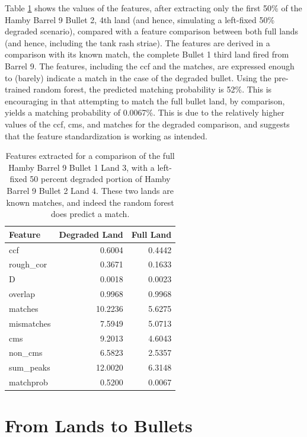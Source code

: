 \documentclass[12pt,]{article}
\theoremstyle{definition}
\theoremstyle{definition}
\theoremstyle{definition}
\theoremstyle{remark}
\begin{document}
Table \ref{tab:br924pred} shows the values of the features, after
extracting only the first 50\% of the Hamby Barrel 9 Bullet 2, 4th land
(and hence, simulating a left-fixed 50\% degraded scenario), compared
with a feature comparison between both full lands (and hence, including
the tank rash striae). The features are derived in a comparison with its
known match, the complete Bullet 1 third land fired from Barrel 9. The
features, including the ccf and the matches, are expressed enough to
(barely) indicate a match in the case of the degraded bullet. Using the
pre-trained random forest, the predicted matching probability is 52\%.
This is encouraging in that attempting to match the full bullet land, by
comparison, yields a matching probability of 0.0067\%. This is due to
the relatively higher values of the ccf, cms, and matches for the
degraded comparison, and suggests that the feature standardization is
working as intended.

\begin{table}[ht]
\centering
\begin{tabular}{lrr}
  \hline
Feature & Degraded Land & Full Land \\ 
  \hline
ccf & 0.6004 & 0.4442 \\ 
  rough\_cor & 0.3671 & 0.1633 \\ 
  D & 0.0018 & 0.0023 \\ 
  overlap & 0.9968 & 0.9968 \\ 
  matches & 10.2236 & 5.6275 \\ 
  mismatches & 7.5949 & 5.0713 \\ 
  cms & 9.2013 & 4.6043 \\ 
  non\_cms & 6.5823 & 2.5357 \\ 
  sum\_peaks & 12.0020 & 6.3148 \\ 
  matchprob & 0.5200 & 0.0067 \\ 
   \hline
\end{tabular}
\caption{Features extracted for a comparison of the full Hamby Barrel 9 Bullet 1 Land 3, with a left-fixed 50 percent degraded portion of Hamby Barrel 9 Bullet 2 Land 4. These two lands are known matches, and indeed the random forest does predict a match.} 
\label{tab:br924pred}
\end{table}


\section{From Lands to Bullets}\label{from-lands-to-bullets}
\end{document}
